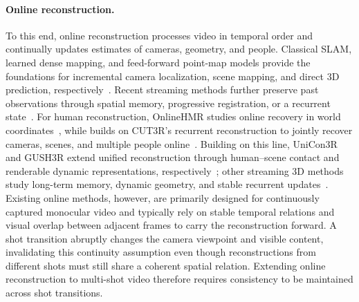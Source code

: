 \paragraph{Online reconstruction.}
To this end, online reconstruction processes video in temporal order and
continually updates estimates of cameras, geometry, and people. Classical
SLAM, learned dense mapping, and feed-forward point-map models provide the
foundations for incremental camera localization, scene mapping, and direct 3D
prediction, respectively~\citep{teed2021droidslam,sun2021neuralrecon,wang2024dust3r,leroy2024mast3r,zhang2025monst3r,wang2025vggt}.
Recent streaming methods further preserve past observations through spatial
memory, progressive registration, or a recurrent
state~\citep{wang2025spann3r,liu2025slam3r,wang2025cut3r}. For human
reconstruction, OnlineHMR studies online recovery in world
coordinates~\citep{zhao2026onlinehmr}, while \humanthree{} builds on CUT3R's
recurrent reconstruction to jointly recover cameras, scenes, and multiple
people online~\citep{chen2026human3r}. Building on this line, UniCon3R and
GUSH3R extend unified reconstruction through human--scene contact and
renderable dynamic representations,
respectively~\citep{sur2026unicon3r,abe2026gush3r}; other streaming 3D methods
study long-term memory, dynamic geometry, and stable recurrent
updates~\citep{chen2025long3r,wu2025point3r,zhuo2025st4r,chen2026ttt3r,zheng2026ttsa3r,li2026recal3r}.
Existing online methods, however, are primarily designed for continuously
captured monocular video and typically rely on stable temporal relations and
visual overlap between adjacent frames to carry the reconstruction forward. A
shot transition abruptly changes the camera viewpoint and visible content,
invalidating this continuity assumption even though reconstructions from
different shots must still share a coherent spatial relation. Extending online
reconstruction to multi-shot video therefore requires consistency to be
maintained across shot transitions.


